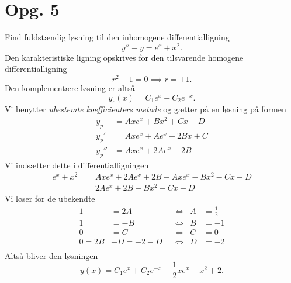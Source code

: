\documentclass[12pt]{article}
\theoremstyle{definition}
\begin{document}
\section*{Opg. 5}
Find fuldstændig løsning til den inhomogene differentialligning
\[
y'' - y = e^x + x^2
.\]
\bigbreak
Den karakteristiske ligning opskrives for den tilsvarende homogene differentialligning
\[
r^2-1 = 0 \implies r = \pm 1 
.\]
Den komplementære løsning er altså
\[
y_c(x) = C_1e^{x} + C_2e^{-x}
.\]
Vi benytter \textit{ubestemte koefficienters metode} og gætter på en løsning på formen
\begin{align*}
y_p &= Axe^{x} + Bx^2 + Cx + D  \\
y_p' &= Axe^{x} + Ae^{x} + 2Bx + C  \\
y_p'' &= Axe^{x} + 2Ae^{x} + 2B
\end{align*}
Vi indsætter dette i differentialligningen
\begin{align*}
e^x + x^2 &= Axe^{x} + 2Ae^{x} + 2B - Axe^{x} - Bx^2 - Cx - D \\
&= 2Ae^{x} + 2B - Bx^2 - Cx - D
\end{align*}
Vi løser for de ubekendte
\begin{align*}
  1 &= 2A & &\iff & A &= \frac{1}{2} \\
  1 &= -B & &\iff & B &= -1 \\
  0 &= C & &\iff & C &= 0 \\
  0 = 2B &- D = -2 - D & &\iff & D &= -2 \\
\end{align*}
Altså bliver den løsningen
\[
y(x) = C_1e^{x} + C_2e^{-x} + \frac{1}{2}xe^{x} - x^2 + 2
.\]
\end{document}
